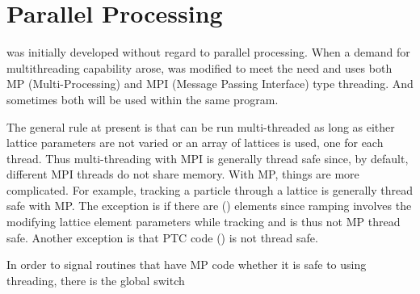 {{{{{{{{{{{%
\section{Parallel Processing}
\label{s:parallel.proc}

\bmad was initially developed without regard to parallel processing. When a demand for
multithreading capability arose, \bmad was modified to meet the need and uses both MP
(Multi-Processing) and MPI (Message Passing Interface) type threading. And sometimes both will be
used within the same program.

The general rule at present is that \bmad can be run multi-threaded as long as either lattice
parameters are not varied or an array of lattices is used, one for each thread. Thus multi-threading
with MPI is generally thread safe since, by default, different MPI threads do not share memory. With
MP, things are more complicated.  For example, tracking a particle through a lattice is generally
thread safe with MP. The exception is if there are  () elements since
ramping involves the modifying lattice element parameters while tracking and is thus not MP thread
safe. Another exception is that PTC code () is not thread safe.

In order to signal routines that have MP code whether it is safe to using threading, there is the
global switch \vn{global_com%

\subsection{GPU Acceleration}
\label{s:gpu.accel}
\index{GPU tracking!parallel processing}
\index{CUDA!parallel processing}

In addition to CPU-based parallelism via MP and MPI, \bmad supports GPU-accelerated particle
tracking via NVIDIA CUDA (\sref{s:gpu.tracking}). When \vn{bmad_com%
\vn{True}, bunch tracking through eligible elements is offloaded to the GPU, where all particles in
a bunch are tracked in parallel by CUDA threads.

GPU tracking operates at the bunch level within \vn{track1_bunch_hom} and is orthogonal to MP/MPI
parallelism. For example, a program could use MPI to distribute different bunches across nodes while
each node uses GPU tracking to accelerate per-bunch computations. GPU tracking is not thread safe
with MP: only one CPU thread should call the GPU tracking routines at a time.

}}}}}}}}}}}}}
